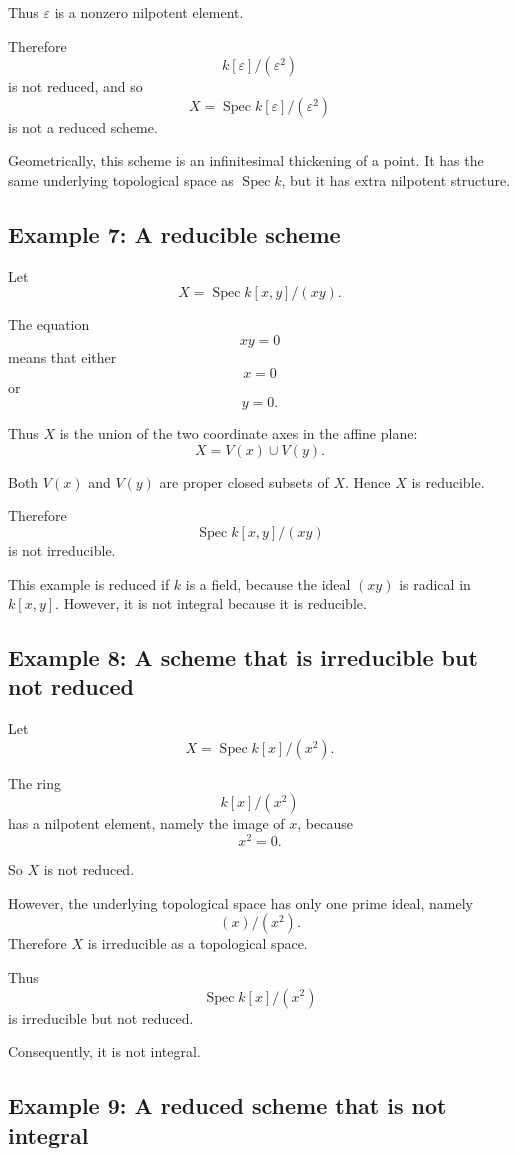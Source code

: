 \documentclass[12pt,a4paper]{article}
\theoremstyle{notespace}
\begin{document}
Thus \(\varepsilon\) is a nonzero nilpotent element.

Therefore
\[
k[\varepsilon]/(\varepsilon^2)
\]
is not reduced, and so
\[
X=\operatorname{Spec} k[\varepsilon]/(\varepsilon^2)
\]
is not a reduced scheme.

Geometrically, this scheme is an infinitesimal thickening of a point. It has the same underlying topological space as \(\operatorname{Spec} k\), but it has extra nilpotent structure.

\subsection{Example 7: A reducible scheme}

Let
\[
X=\operatorname{Spec} k[x,y]/(xy).
\]

The equation
\[
xy=0
\]
means that either
\[
x=0
\]
or
\[
y=0.
\]

Thus \(X\) is the union of the two coordinate axes in the affine plane:
\[
X=V(x)\cup V(y).
\]

Both \(V(x)\) and \(V(y)\) are proper closed subsets of \(X\). Hence \(X\) is reducible.

Therefore
\[
\operatorname{Spec} k[x,y]/(xy)
\]
is not irreducible.

This example is reduced if \(k\) is a field, because the ideal \((xy)\) is radical in \(k[x,y]\). However, it is not integral because it is reducible.

\subsection{Example 8: A scheme that is irreducible but not reduced}

Let
\[
X=\operatorname{Spec} k[x]/(x^2).
\]

The ring
\[
k[x]/(x^2)
\]
has a nilpotent element, namely the image of \(x\), because
\[
x^2=0.
\]

So \(X\) is not reduced.

However, the underlying topological space has only one prime ideal, namely
\[
(x)/(x^2).
\]
Therefore \(X\) is irreducible as a topological space.

Thus
\[
\operatorname{Spec} k[x]/(x^2)
\]
is irreducible but not reduced.

Consequently, it is not integral.

\subsection{Example 9: A reduced scheme that is not integral}
\end{document}
